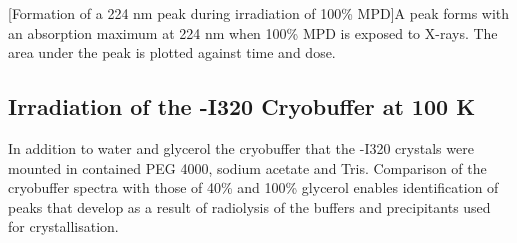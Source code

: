 \begin{minipage}{\linewidth}
	[Formation of a 224 nm peak during irradiation of 100\% MPD]{A peak forms with an absorption maximum at 224 nm when 100\% MPD is exposed to X-rays. The area under the peak is plotted against time and dose.\label{fig:MPD100peak}}	
\end{minipage}
  
\FloatBarrier
\clearpage
\subsection{Irradiation of the \atpdx -I320 Cryobuffer at 100 K}
In addition to water and glycerol the cryobuffer that the \atpdx -I320 crystals were mounted in contained PEG 4000, sodium acetate and Tris. Comparison of the cryobuffer spectra with those of 40\% and 100\% glycerol enables identification of peaks that develop as a result of radiolysis of the buffers and precipitants used for crystallisation.   

